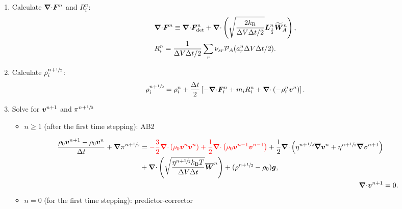 \documentclass[
10pt
showpacs, showkeys,
amsmath,amssymb,
aps,
pre,
floatfix,
]{revtex4-1}
\newcommand{\divg}{{\V\nabla\cdot}}                       %
\begin{document}
\begin{enumerate}

\item Calculate $\divg\V{F}^n$ and $R^n_i$:
\begin{align}
\label{boussinesq_fluxdiv_2nd}
& \divg\V{F}^n \equiv \divg\V{F}_\mathrm{det}^n + \divg\left( \sqrt{ \frac{2k_\mathrm{B}}{\D{V}\D{t}/2} } \V{L}^n_{\frac12} \widetilde{\V{W}}^n_A \right), \\
\label{boussinesq_chemrate_2nd}
& R^n_i = \frac{1}{\D{V}\D{t}/2}\sum_r \nu_{sr}\mathcal{P}_A(a^n_r\D{V}\D{t}/2).
\end{align}

\item Calculate $\rho^{n+\sfrac{1}{2}}_i$:
\begin{equation}
\rho^{n+\myhalf}_i = \rho^n_i + \frac{\D{t}}{2} \left[ -\divg\V{F}^n_i + m_i R^n_i + \divg\left( -\rho^n_i \V{v}^n \right) \right].
\end{equation}

\item Solve for $\boldsymbol{v}^{n+1}$ and $\pi^{n+\sfrac{1}{2}}$

\begin{itemize}

\item $n\ge1$ (after the first time stepping): AB2

\begin{align}
\begin{split}
\frac{\rho_0\V{v}^{n+1}-\rho_0\V{v}^n}{\D{t}} + \grad\pi^{n+\myhalf}
& = {\color{red}-\frac{3}{2}\divg\left(\rho_0\V{v}^n\V{v}^n\right) + \frac{1}{2}\divg\left(\rho_0\V{v}^{n-1}\V{v}^{n-1}\right)} + 
\frac{1}{2}\divg\left( \eta^{n+\myhalf} \overline{\grad}\V{v}^n + \eta^{n+\myhalf} \overline{\grad}\V{v}^{n+1} \right) \\
&+ \divg\left( \sqrt{\frac{\eta^{n+\myhalf} k_\mathrm{B}T}{\D{V}\D{t}} } \overline{\V{W}}^n \right)
+ (\rho^{n+\myhalf}-\rho_0)\V{g},
\end{split}
\\
\divg\V{v}^{n+1} & = 0.
\end{align}

\item $n=0$ (for the first time stepping): predictor-corrector


\end{itemize}
\end{enumerate}
\end{document}
